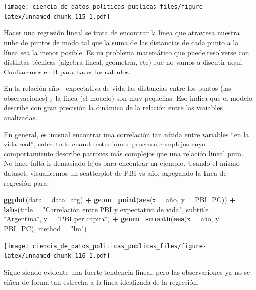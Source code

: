 \documentclass[]{book}
\newenvironment{Shaded}{\begin{snugshade}}{\end{snugshade}}
\newcommand{\KeywordTok}[1]{\textcolor[rgb]{0.13,0.29,0.53}{\textbf{#1}}}
\newcommand{\DataTypeTok}[1]{\textcolor[rgb]{0.13,0.29,0.53}{#1}}
\newcommand{\StringTok}[1]{\textcolor[rgb]{0.31,0.60,0.02}{#1}}
\newcommand{\OperatorTok}[1]{\textcolor[rgb]{0.81,0.36,0.00}{\textbf{#1}}}
\newcommand{\NormalTok}[1]{#1}
\begin{document}
\texttt{[image: ciencia\_de\_datos\_politicas\_publicas\_files/figure-latex/unnamed-chunk-115-1.pdf]}

Hacer una regresión lineal se trata de encontrar la línea que atraviesa
nuestra nube de puntos de modo tal que la suma de las distancias de cada
punto a la línea sea la menor posible. Es un problema matemático que
puede resolverse con distintas técnicas (algebra lineal, geometría, etc)
que no vamos a discutir aquí. Confiaremos en R para hacer los cálculos.

En la relación año - expectativa de vida las distancias entre los puntos
(las observaciones) y la línea (el modelo) son muy pequeñas. Eso indica
que el modelo describe con gran precisión la dinámica de la relación
entre las variables analizadas.

En general, es inusual encontrar una correlación tan nítida entre
variables ``en la vida real'', sobre todo cuando estudiamos procesos
complejos cuyo comportamiento describe patrones más complejos que una
relación lineal pura. No hace falta ir demasiado lejos para encontrar un
ejemplo. Usando el mismo dataset, visualicemos un scatterplot de PBI vs
año, agregando la línea de regresión para:

\begin{Shaded}
\begin{Highlighting}[]
\KeywordTok{ggplot}\NormalTok{(}\DataTypeTok{data =}\NormalTok{ data_arg) }\OperatorTok{+}\StringTok{ }
\StringTok{    }\KeywordTok{geom_point}\NormalTok{(}\KeywordTok{aes}\NormalTok{(}\DataTypeTok{x =}\NormalTok{ año, }\DataTypeTok{y =}\NormalTok{ PBI_PC)) }\OperatorTok{+}
\StringTok{    }\KeywordTok{labs}\NormalTok{(}\DataTypeTok{title =} \StringTok{"Correlación entre PBI y expectativa de vida"}\NormalTok{,}
         \DataTypeTok{subtitle =} \StringTok{"Argentina"}\NormalTok{,}
         \DataTypeTok{y =} \StringTok{"PBI per cápita"}\NormalTok{) }\OperatorTok{+}
\StringTok{    }\KeywordTok{geom_smooth}\NormalTok{(}\KeywordTok{aes}\NormalTok{(}\DataTypeTok{x =}\NormalTok{ año, }\DataTypeTok{y =}\NormalTok{ PBI_PC), }\DataTypeTok{method =} \StringTok{"lm"}\NormalTok{)}
\end{Highlighting}
\end{Shaded}

\texttt{[image: ciencia\_de\_datos\_politicas\_publicas\_files/figure-latex/unnamed-chunk-116-1.pdf]}

Sigue siendo evidente una fuerte tendencia lineal, pero las
observaciones ya no se ciñen de forma tan estrecha a la línea idealizada
de la regresión.
\end{document}
